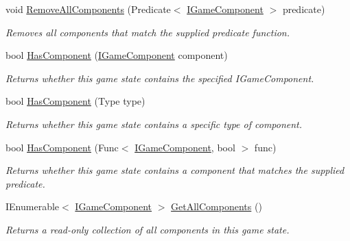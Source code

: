 \begin{DoxyCompactItemize}
void \hyperlink{class_tri_devs_1_1_tri_engine2_d_1_1_state_management_1_1_game_state_ae5ed08d9ca56b624068a477902de56b1}{Remove\-All\-Components} (Predicate$<$ \hyperlink{interface_tri_devs_1_1_tri_engine2_d_1_1_interfaces_1_1_i_game_component}{I\-Game\-Component} $>$ predicate)
\begin{DoxyCompactList}\small\item\em Removes all components that match the supplied predicate function. \end{DoxyCompactList}\item 
bool \hyperlink{class_tri_devs_1_1_tri_engine2_d_1_1_state_management_1_1_game_state_af9248f0b37ff14a01b4a4e8365fa79c9}{Has\-Component} (\hyperlink{interface_tri_devs_1_1_tri_engine2_d_1_1_interfaces_1_1_i_game_component}{I\-Game\-Component} component)
\begin{DoxyCompactList}\small\item\em Returns whether this game state contains the specified I\-Game\-Component. \end{DoxyCompactList}\item 
bool \hyperlink{class_tri_devs_1_1_tri_engine2_d_1_1_state_management_1_1_game_state_af939166ddc88eeba03831893ff67de0d}{Has\-Component} (Type type)
\begin{DoxyCompactList}\small\item\em Returns whether this game state contains a specific type of component. \end{DoxyCompactList}\item 
bool \hyperlink{class_tri_devs_1_1_tri_engine2_d_1_1_state_management_1_1_game_state_a39f7799bc961aab20a70fedc9af698af}{Has\-Component} (Func$<$ \hyperlink{interface_tri_devs_1_1_tri_engine2_d_1_1_interfaces_1_1_i_game_component}{I\-Game\-Component}, bool $>$ func)
\begin{DoxyCompactList}\small\item\em Returns whether this game state contains a component that matches the supplied predicate. \end{DoxyCompactList}\item 
I\-Enumerable$<$ \hyperlink{interface_tri_devs_1_1_tri_engine2_d_1_1_interfaces_1_1_i_game_component}{I\-Game\-Component} $>$ \hyperlink{class_tri_devs_1_1_tri_engine2_d_1_1_state_management_1_1_game_state_a475ae428f7c2c7ef10fa2cb12f3c6574}{Get\-All\-Components} ()
\begin{DoxyCompactList}\small\item\em Returns a read-\/only collection of all components in this game state. \end{DoxyCompactList}\item 

\end{DoxyCompactItemize}

